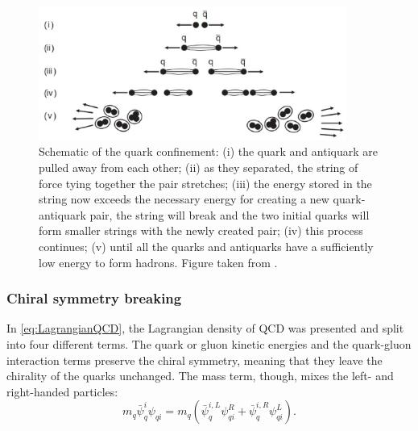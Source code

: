 \begin{figure}[t]
\begin{center}
\includegraphics[width=0.9\textwidth]{Figs/Chapter2/Screenshot_20230220_214232.eps}
\end{center}
\caption{Schematic of the quark confinement: (i) the quark and antiquark are pulled away from each other; (ii) as they separated, the string of force tying together the pair stretches; (iii) the energy stored in the string now exceeds the necessary energy for creating a new quark-antiquark pair, the string will break and the two initial quarks will form smaller strings with the newly created pair; (iv) this process continues; (v) until all the quarks and antiquarks have a sufficiently low energy to form hadrons. Figure taken from \cite{thomsonModernParticlePhysics2013}.}
\label{fig:QuarkFragmentation}
\end{figure}


\subsubsection{Chiral symmetry breaking}
\label{subsubsec:chiralsymmetrybreaking}

In \eq\ref{eq:LagrangianQCD}, the Lagrangian density of QCD was presented and split into four different terms. The quark or gluon kinetic energies and the quark-gluon interaction terms preserve the chiral symmetry, meaning that they leave the chirality of the quarks unchanged. The mass term, though, mixes the left- and right-handed particles:
\begin{equation}
m_{q} \bar{\psi}_{q}^{i} \psi_{qi} = m_{q} \left( \bar{\psi}_{q}^{i, L} \psi_{qi}^{R} + \bar{\psi}_{q}^{i, R} \psi_{qi}^{L} \right).
\label{eq:LagrangianQCDMassTerm}
\end{equation}

